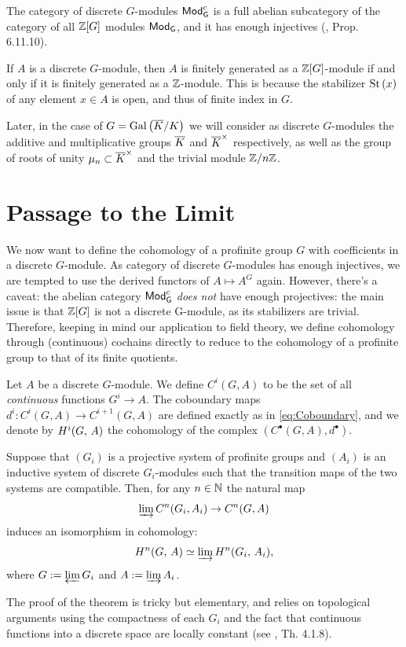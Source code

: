 \documentclass[a4paper, oneside]{memoir}
\begin{document}
\noindent The category of discrete $G$-modules $\mathsf{Mod}_\mathsf{G}^{c}$ is a full abelian subcategory of the category of all $\mathbb{Z}[G]$ modules $\mathsf{Mod}_\mathsf{G}$, and it has enough injectives (\cite{Weibel}, Prop. 6.11.10).

\begin{remark}\label{rm:FinType}
	If $A$ is a discrete $G$-module, then $A$ is finitely generated as a $\mathbb{Z}[G]$-module if and only if it is finitely generated as a $\mathbb{Z}$-module. This is because the stabilizer $\operatorname{St}{(x)}$ of any element $x\in A$ is open, and thus of finite index in $G$.
\end{remark}

\begin{example}
	Later, in the case of $G=\operatorname{Gal}\left( \overline{K}/K \right)$ we will consider as discrete $G$-modules the additive and multiplicative groups $\overline{K}$ and $\overline{K}^\times$ respectively, as well as the group of roots of unity $\mu_n\subset\overline{K}^\times$ and the trivial module $\mathbb{Z}/n\mathbb{Z}$.
\end{example}

\section{Passage to the Limit}

We now want to define the cohomology of a profinite group $G$ with coefficients in a discrete $G$-module. As category of discrete $G$-modules has enough injectives, we are tempted to use the derived functors of $A\mapsto A^G$ again. However, there's a caveat: the abelian category $\mathsf{Mod}_\mathsf{G}^{c}$ \textit{does not} have enough projectives: the main issue is that $\mathbb{Z}[G]$ is not a discrete G-module, as its stabilizers are trivial. Therefore, keeping in mind our application to field theory, we define cohomology through (continuous) cochains  directly to reduce to the cohomology of a profinite group to that of its finite quotients.

\begin{definition}
	Let $A$ be a discrete $G$-module. We define $C^i(G,A)$ to be the set of all \textit{continuous} functions $G^i\to A$. The coboundary maps $d^i: C^i(G,A)\to C^{i+1}(G,A)$ are defined exactly as in \eqref{eq:Coboundary}, and we denote by $H^{i}( G, \, A )$ the cohomology of the complex $(C^\bullet(G,A),d^\bullet)$.
\end{definition}

\begin{theorem}\label{thm:IndLim}
	Suppose that $(G_i)$ is a projective system of profinite groups and $(A_i)$ is an inductive system of discrete $G_i$-modules such that the transition maps of the two systems are compatible. Then, for any $n\in\mathbb{N}$ the natural map
	\[
		\varinjlim{C^n(G_i,A_i)}\to C^n(G,A)
	\]
	induces an isomorphism in cohomology:
	\[
		H^{n}( G, \, A )\simeq \varinjlim{H^{n}( G_i, \, A_i )},
	\]
	where $G:=\varprojlim{G_i}$ and $A:=\varinjlim{A_i}$.
\end{theorem}
The proof of the theorem is tricky but elementary, and relies on topological arguments using the compactness of each $G_i$ and the fact that continuous functions into a discrete space are locally constant (see \cite{Harari}, Th. 4.1.8).
\end{document}
